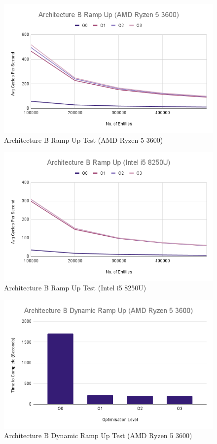 \documentclass{article}
\begin{document}
\begin{figure}[!h]
\centering
\includegraphics[scale=0.5]{Architecture B Ramp Up (AMD Ryzen 5 3600).png}
\caption{Architecture B Ramp Up Test (AMD Ryzen 5 3600)}
\label{arch_b_ramp_up_pc}
\end{figure}

\begin{figure}[!h]
\centering
\includegraphics[scale=0.5]{Architecture B Ramp Up (Intel i5 8250U).png}
\caption{Architecture B Ramp Up Test (Intel i5 8250U)}
\label{arch_b_ramp_up_laptop}
\end{figure}

\begin{figure}[!h]
\centering
\includegraphics[scale=0.5]{Architecture B Dynamic Ramp Up (AMD Ryzen 5 3600).png}
\caption{Architecture B Dynamic Ramp Up Test (AMD Ryzen 5 3600)}
\label{arch_b_dynamic_ramp_up_pc}
\end{figure}
\end{document}
